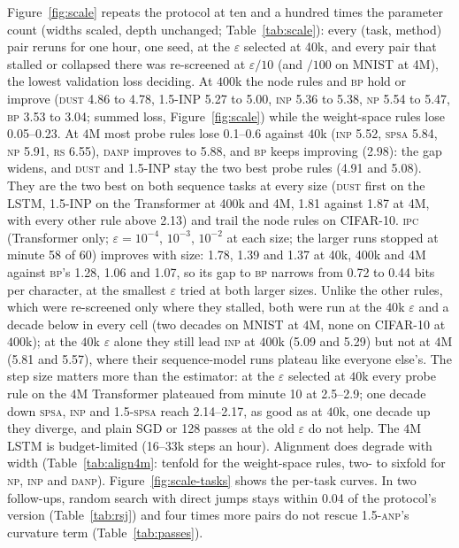 \documentclass{article}
\newcommand{\method}[1]{\textsc{#1}}
\newcommand{\BP}{\method{bp}}
\newcommand{\SPSA}{\method{spsa}}
\newcommand{\SPSAb}{\method{1.5-spsa}}
\newcommand{\RS}{\method{rs}}
\newcommand{\NP}{\method{np}}
\newcommand{\ANPb}{\method{1.5-anp}}
\newcommand{\INP}{\method{inp}}
\newcommand{\DANP}{\method{danp}}
\newcommand{\DUST}{\method{dust}}
\newcommand{\IPC}{\method{ipc}}
\begin{document}
Figure~\ref{fig:scale} repeats the protocol at ten and a hundred times the parameter
count (widths scaled, depth unchanged; Table~\ref{tab:scale}): every (task, method)
pair reruns for one hour, one seed, at the $\varepsilon$ selected at 40k, and every
pair that stalled or collapsed there was re-screened at $\varepsilon/10$ (and $/100$ on
MNIST at 4M), the lowest validation loss deciding.
At $400$k the node rules and \BP{} hold or improve (\DUST{} 4.86 to 4.78, 1.5-INP 5.27 to
5.00, \INP{} 5.36 to 5.38, \NP{} 5.54 to 5.47, \BP{} 3.53 to 3.04; summed loss,
Figure~\ref{fig:scale}) while the weight-space rules lose 0.05--0.23. At $4$M most probe
rules lose 0.1--0.6 against $40$k (\INP{} 5.52, \SPSA{} 5.84, \NP{} 5.91, \RS{} 6.55),
\DANP{} improves to 5.88, and \BP{} keeps improving (2.98): the gap widens, and \DUST{} and
1.5-INP stay the two best probe rules (4.91 and 5.08). They are the two best on both
sequence tasks at every size (\DUST{} first on the LSTM, 1.5-INP on the Transformer at 400k
and 4M, 1.81 against 1.87 at 4M, with every other rule above 2.13) and trail the node rules
on CIFAR-10. \IPC{} (Transformer only; $\varepsilon=10^{-4}$, $10^{-3}$, $10^{-2}$ at each size;
the larger runs stopped at minute 58 of 60) improves with size: 1.78, 1.39 and 1.37 at
40k, 400k and 4M against \BP{}'s 1.28, 1.06 and 1.07, so its gap to \BP{} narrows from
0.72 to 0.44 bits per character, at the smallest $\varepsilon$ tried at both larger sizes. Unlike the other rules, which were re-screened only where they stalled, both
were run at the $40$k $\varepsilon$ and a decade below in every cell (two decades on MNIST
at $4$M, none on CIFAR-10 at $400$k); at the $40$k $\varepsilon$ alone they still lead \INP{}
at $400$k (5.09 and 5.29) but not at $4$M (5.81 and 5.57), where their sequence-model runs
plateau like everyone else's. The step size matters more than the
estimator: at the $\varepsilon$ selected at $40$k every probe rule on the $4$M
Transformer plateaued from minute 10 at 2.5--2.9; one decade down \SPSA{}, \INP{} and
\SPSAb{} reach 2.14--2.17, as good as at $40$k, one decade up they diverge, and plain
SGD or 128 passes at the old $\varepsilon$ do not help.
The $4$M LSTM is budget-limited (16--33k steps an hour). Alignment does degrade with
width (Table~\ref{tab:align4m}: tenfold for the weight-space rules, two- to sixfold for \NP{}, \INP{} and \DANP{}). Figure~\ref{fig:scale-tasks} shows the per-task curves. In two follow-ups, random search
with direct jumps stays within 0.04 of the protocol's version (Table~\ref{tab:rsj}) and four
times more pairs do not rescue \ANPb{}'s curvature term (Table~\ref{tab:passes}).
\end{document}
